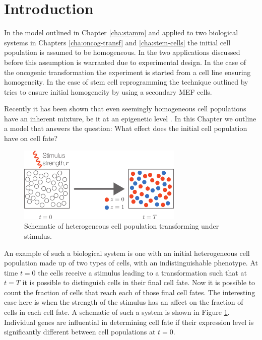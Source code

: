 \section{Introduction}
\label{sec:introduction-cell}

In the model outlined in Chapter \ref{cha:stamm} and applied to two biological systems in Chapters \ref{cha:oncog-transf} and \ref{cha:stem-cells} the initial cell population is assumed to be homogeneous. In the two applications discussed before this assumption is warranted due to experimental design. In the case of the oncogenic transformation the experiment is started from a cell line ensuring homogeneity. In the case of stem cell reprogramming the technique outlined by \cite{Hanna:2009ix} tries to ensure initial homogeneity  by using a secondary MEF cells.

Recently it has been shown that even seemingly homogeneous cell populations have an inherent mixture, be it at an epigenetic level \citep{Heng:2009em,Gerlinger:2012wu}. In this Chapter we outline a model that answers the question: What effect does the initial cell population have on cell fate?


\begin{figure}[h]
  \centering
  \includegraphics[width=0.7\textwidth]{pics/cell-cycle-model.pdf}
  \caption{Schematic of heterogeneous cell population transforming under stimulus.}
  \label{fig:cell-cycle-model}
\end{figure}

An example of such a biological system is one with an initial heterogeneous cell population made up of two types of cells, with an indistinguishable phenotype. At time $t=0$ the cells receive a stimulus leading to a transformation such that at $t=T$ it is possible to distinguish cells in their final cell fate. Now it is possible to count the fraction of cells that reach each of those final cell fates. The interesting case here is when the strength of the stimulus has an affect on the fraction of cells in each cell fate. A schematic of such a system is shown in Figure \ref{fig:cell-cycle-model}. Individual genes are influential in determining cell fate if their expression level is significantly different between cell populations at $t=0$. 

